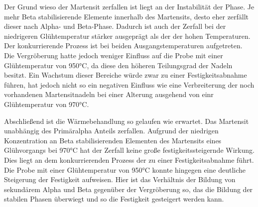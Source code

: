 \documentclass[a4paper, 11pt]{tubsreprt}
\begin{document}
Der Grund wieso der Martensit zerfallen ist liegt an der Instabilität der Phase. Je mehr Beta stabilisierende Elemente innerhalb des Martensits, desto eher zerfällt dieser nach Alpha- und Beta-Phase. Dadurch ist auch der Zerfall bei der niedrigeren Glühtemperatur stärker ausgeprägt als der der hohen Temperaturen. Der konkurrierende Prozess ist bei beiden Ausgangstemperaturen aufgetreten. Die Vergröberung hatte jedoch weniger Einfluss auf die Probe mit einer Glühtemperatur von 950°C, da diese den höheren Teilungsgrad der Nadeln besitzt. Ein Wachstum dieser Bereiche würde zwar zu einer Festigkeitsabnahme führen, hat jedoch nicht so ein negativen Einfluss wie eine Verbreiterung der noch vorhandenen Martensitnadeln bei einer Alterung ausgehend von einr Glühtemperatur von 970°C.

Abschließend ist die Wärmebehandlung so gelaufen wie erwartet. Das Martensit unabhängig des Primäralpha Anteils zerfallen. Aufgrund der niedrigen Konzentration an Beta stabilisierenden Elementen des Martensits eines Glühvorgangs bei 970°C hat der Zerfall keine große festigkeitssteigernde Wirkung. Dies liegt an dem konkurrierenden Prozess der zu einer Festigkeitsabnahme führt. Die Probe mit einer Glühtemperatur von 950°C konnte hingegen eine deutliche Steigerung der Festigkeit aufweisen. Hier ist das Verhältnis der Bildung von sekundärem Alpha und Beta gegenüber der Vergröberung so, das die Bildung der stabilen Phasen überwiegt und so die Festigkeit gesteigert werden kann.


\listoffigures
\listoftables
\end{document}

